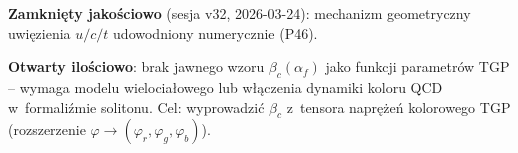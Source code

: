 \begin{remark}%
\label{rem:OP5-status}
\textbf{Zamkni\k{e}ty jako\'sciowo} (sesja v32, 2026-03-24):
mechanizm geometryczny uwi\k{e}zienia $u/c/t$ udowodniony numerycznie (P46).
\par
\textbf{Otwarty ilo\'sciowo}: brak jawnego wzoru $\beta_c(\alpha_f)$ jako funkcji
parametr\'ow TGP -- wymaga modelu wielocia\l{}owego lub w\l{}\k{a}czenia
dynamiki koloru QCD w~formali\'{z}mie solitonu.
Cel: wyprowadzi\'c $\beta_c$ z~tensora napr\k{e}\.ze\'n kolorowego TGP
(rozszerzenie $\varphi \to (\varphi_r, \varphi_g, \varphi_b)$).
\end{remark}
